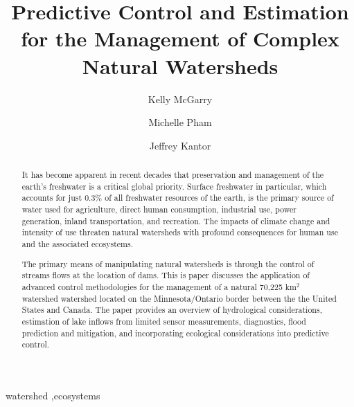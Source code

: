 \documentclass[preprint,times]{elsarticle}
\title{Predictive Control and Estimation for the Management of Complex Natural Watersheds}
\author{Kelly McGarry}
\author{Michelle Pham}
\author{Jeffrey Kantor\corref{cor1}\fnref{fn1}}
\begin{document}
\begin{abstract}
It has become apparent in recent decades that preservation and management of the earth's freshwater is a critical global priority. Surface freshwater in particular, which  accounts for just 0.3\% of all freshwater resources of the earth, is the primary source of water used for agriculture, direct human consumption, industrial use, power generation, inland transportation, and recreation. The impacts of climate change and intensity of use threaten natural watersheds with profound consequences for human use and the associated ecosystems. 

The primary means of manipulating natural watersheds is through the control of streams flows at the location of dams. This is paper discusses the application of advanced control methodologies for the management of a natural 70,225 km$^2$ watershed watershed located on the Minnesota/Ontario border between the the United States and Canada. The paper provides an overview of hydrological considerations, estimation of lake inflows from limited sensor measurements, diagnostics, flood prediction and mitigation, and incorporating ecological considerations into predictive control.
\end{abstract}

\begin{keyword}
watershed \sep ecosystems 
\end{keyword}

\maketitle
\end{document}
